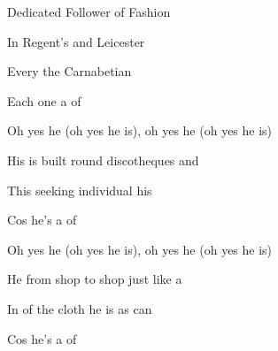 \begin{SBSong}{Dedicated Follower of Fashion}
\begin{SBVerse}
    In Regent's  and Leicester  
    
    Every the Carnabetian   
    
    Each one a   of 
  \end{SBVerse}
  \CBPageBrk
  \begin{SBVerse}
    Oh yes he  (oh yes he is), oh yes he  (oh yes he is)
    
    His  is built round discotheques and 
    
    This  seeking individual   his 
    
    Cos he's a   of 
  \end{SBVerse}
  \begin{SBVerse}
     Oh yes he  (oh yes he is), oh yes he  (oh yes he is)
    
    He  from shop to shop just like a 
    
    In  of the cloth he is as   can 
    
    Cos he's a   of   
  \end{SBVerse}
\end{SBSong}